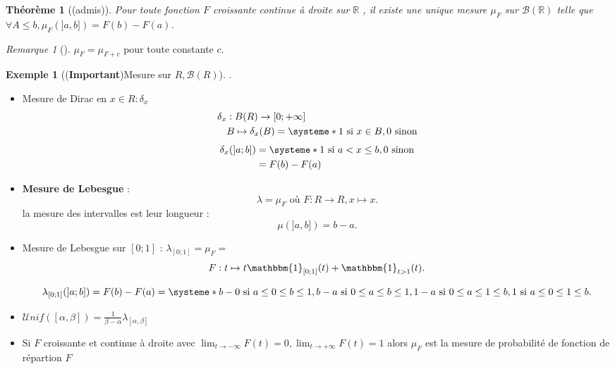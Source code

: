 \documentclass{article}
\theoremstyle{plain}%
\newtheorem{thm}{Théorème}[section]
\theoremstyle{definition}
\newtheorem{exmp}{Exemple}[section]
\theoremstyle{remark}
\newtheorem*{rem}{Remarque}
\begin{document}
\begin{thm}[(admis)]
    Pour toute fonction $ F $ croissante continue à droite sur $ \mathbb{R} $ , il existe une unique mesure $ \mu _F $ sur $ \mathcal{B}(\mathbb{R}) $ telle que $ \forall A \leq b, \mu _F(]a,b]) = F(b) - F(a) $.
\end{thm}
\begin{rem}[]
    $ \mu _F = \mu _{F+c} $ pour toute constante $ c $.
\end{rem}
\begin{exmp}[(\textbf{Important})Mesure sur $ R,\mathcal{B}(R) $]
    .\\
    \begin{itemize}
        \item Mesure de Dirac en $ x \in R : \delta _x $ \begin{align*}
            \delta _x &: B(R) \to [0;+\infty] \\
                & B \mapsto \delta _x (B) = \systeme*{
                            1 \text{ si } x \in B,
                            0 \text{ sinon}
                        }
        \end{align*}
        \begin{align*}
            \delta _x (]a;b]) &= \systeme*{
                1 \text{ si } a < x \leq b,
                0 \text{ sinon}
            } \\
                            &= F(b) - F(a) 
        \end{align*}
        \item \textbf{Mesure de Lebesgue} : 
        \[
            \lambda = \mu _F \text{ où } F: R \to R, x \mapsto x
        .\]
        la mesure des intervalles est leur longueur : 
        \[
            \mu (]a,b]) = b-a
        .\]
        
        \item Mesure de Lebesgue sur $ [0;1] $ : $ \lambda _{[0;1]} = \mu _F =  $ 
        \[
            F: t \mapsto t \mathbbm{1}_{[0;1]}(t) + \mathbbm{1}_{t>1}(t)
        .\]
        
        \[
            \lambda _{[0;1]} (]a;b]) = F(b) - F(a) = \systeme*{
                b-0 \text{ si } a \leq 0 \leq b \leq 1,
                b-a \text{ si } 0 \leq a \leq b \leq 1, 
                1-a \text{ si } 0 \leq a \leq 1 \leq b,
                1 \text{ si } a \leq 0 \leq 1 \leq b
            }
        .\]
        \item $ \mathcal{U}nif ([\alpha , \beta ]) = \frac{1}{\beta - \alpha } \lambda _{[\alpha , \beta ]} $ 
        \item Si $ F $ croissante et continue à droite avec $ \lim_{t \to -\infty} F(t) = 0, \lim_{t \to +\infty} F(t) = 1 $ alors $ \mu _F $ est la mesure de probabilité de fonction de répartion $ F $ 
    \end{itemize}
\end{exmp}
\end{document}
